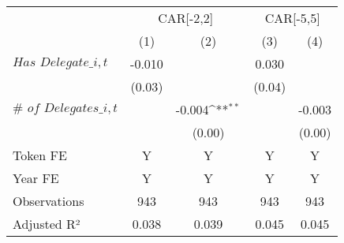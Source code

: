 {
\def\sym#1{\ifmmode^{#1}\else\(^{#1}\)\fi}
\begin{tabular}{l*{4}{c}}
\toprule
                    &\multicolumn{2}{c}{CAR[-2,2]}              &\multicolumn{2}{c}{CAR[-5,5]}              \\\cmidrule(lr){2-3}\cmidrule(lr){4-5}
                    &\multicolumn{1}{c}{(1)}         &\multicolumn{1}{c}{(2)}         &\multicolumn{1}{c}{(3)}         &\multicolumn{1}{c}{(4)}         \\
\midrule
$\textit{Has Delegate}\_{i,t}$&      -0.010         &                     &       0.030         &                     \\
                    &      (0.03)         &                     &      (0.04)         &                     \\
$\textit{# of Delegates}\_{i,t}$&                     &      -0.004\sym{**} &                     &      -0.003         \\
                    &                     &      (0.00)         &                     &      (0.00)         \\
\midrule
Token FE            &           Y         &           Y         &           Y         &           Y         \\
Year FE             &           Y         &           Y         &           Y         &           Y         \\
Observations        &         943         &         943         &         943         &         943         \\
Adjusted R²         &       0.038         &       0.039         &       0.045         &       0.045         \\
\bottomrule
\end{tabular}
}
